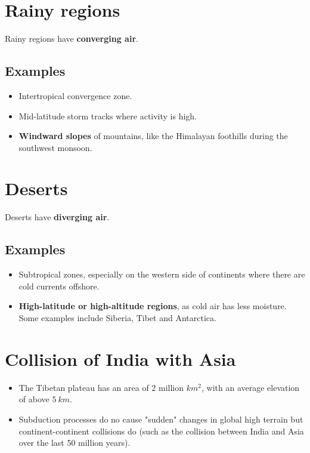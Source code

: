 \documentclass[11pt]{article}
\begin{document}
\newpage

\section{Rainy regions}
\label{sec:orge7e92ba}
Rainy regions have \textbf{converging air}.

\subsection{Examples}
\label{sec:org8bb1f36}
\begin{itemize}
\item Intertropical convergence zone.
\item Mid-latitude storm tracks where activity is high.
\item \textbf{Windward slopes} of mountains, like the Himalayan foothills during the southwest monsoon.
\end{itemize}


\section{Deserts}
\label{sec:orgd627d08}
Deserts have \textbf{diverging air}.

\subsection{Examples}
\label{sec:orgf19d550}
\begin{itemize}
\item Subtropical zones, especially on the western side of continents where there are cold currents offshore.
\item \textbf{High-latitude or high-altitude regions}, as cold air has less moisture. Some examples include Siberia, Tibet and Antarctica.
\end{itemize}


\section{Collision of India with Asia}
\label{sec:orge7cb7a3}
\begin{itemize}
\item The Tibetan plateau has an area of 2 million \(\unit{km^{2}}\), with an average elevation of above \(\qty{5}{km}\).
\item Subduction processes do no cause "sudden" changes in global high terrain but continent-continent collisions do (such as the collision between India and Asia over the last 50 million years).
\end{itemize}
\end{document}
